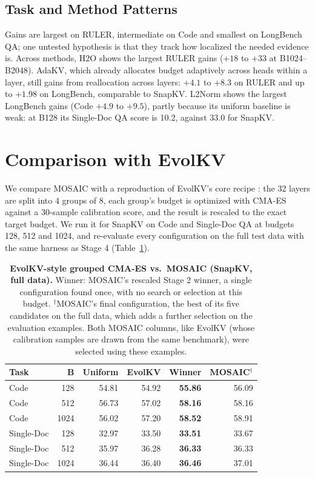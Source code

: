 \documentclass[11pt]{article}
\begin{document}
\subsection{Task and Method Patterns}

Gains are largest on RULER, intermediate on Code and smallest on LongBench QA; one untested hypothesis is that they track how localized the needed evidence is. Across methods, H2O shows the largest RULER gains ($+18$ to $+33$ at B1024--B2048). AdaKV, which already allocates budget adaptively across heads within a layer, still gains from reallocation across layers: $+4.1$ to $+8.3$ on RULER and up to $+1.98$ on LongBench, comparable to SnapKV. L2Norm shows the largest LongBench gains (Code $+4.9$ to $+9.5$), partly because its uniform baseline is weak: at B128 its Single-Doc QA score is 10.2, against 33.0 for SnapKV.

\section{Comparison with EvolKV}

We compare MOSAIC with a reproduction of EvolKV's core recipe \citep{yu2025evolkv}: the 32 layers are split into 4 groups of 8, each group's budget is optimized with CMA-ES against a 30-sample calibration score, and the result is rescaled to the exact target budget. We run it for SnapKV on Code and Single-Doc QA at budgets 128, 512 and 1024, and re-evaluate every configuration on the full test data with the same harness as Stage 4 (Table~\ref{tab:ablation}).

\begin{table}[t]
  \centering
  \footnotesize
  \setlength{\tabcolsep}{2.4pt}
  \begin{tabular}{@{} l r r r r r @{}}
    \toprule
    \textbf{Task} & \textbf{B} & \textbf{Uniform} & \textbf{EvolKV} & \textbf{Winner} & \textbf{MOSAIC}$^\dagger$ \\
    \midrule
    \rowcolor{gray!10}
    Code       & 128  & 54.81 & 54.92 & \textbf{55.86} & 56.09 \\
    Code       & 512  & 56.73 & 57.02 & \textbf{58.16} & 58.16 \\
    \rowcolor{gray!10}
    Code       & 1024 & 56.02 & 57.20 & \textbf{58.52} & 58.91 \\
    Single-Doc & 128  & 32.97 & 33.50 & \textbf{33.51} & 33.67 \\
    \rowcolor{gray!10}
    Single-Doc & 512  & 35.97 & 36.28 & \textbf{36.33} & 36.33 \\
    Single-Doc & 1024 & 36.44 & 36.40 & \textbf{36.46} & 37.01 \\
    \bottomrule
  \end{tabular}
  \caption{\textbf{EvolKV-style grouped CMA-ES vs.\ MOSAIC (SnapKV, full data).} Winner: MOSAIC's rescaled Stage 2 winner, a single configuration found once, with no search or selection at this budget. $^\dagger$MOSAIC's final configuration, the best of its five candidates on the full data, which adds a further selection on the evaluation examples. Both MOSAIC columns, like EvolKV (whose calibration samples are drawn from the same benchmark), were selected using these examples.}
  \label{tab:ablation}
\end{table}
\end{document}
